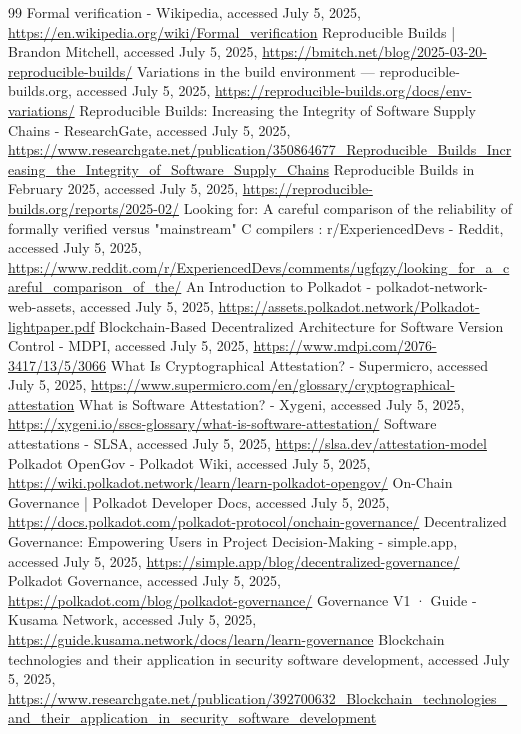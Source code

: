 \documentclass{article}
\begin{document}
\begin{thebibliography}{99}
Formal verification - Wikipedia, accessed July 5, 2025, \url{https://en.wikipedia.org/wiki/Formal\_verification}
Reproducible Builds | Brandon Mitchell, accessed July 5, 2025, \url{https://bmitch.net/blog/2025-03-20-reproducible-builds/}
Variations in the build environment --- reproducible-builds.org, accessed July 5, 2025, \url{https://reproducible-builds.org/docs/env-variations/}
Reproducible Builds: Increasing the Integrity of Software Supply Chains - ResearchGate, accessed July 5, 2025, \url{https://www.researchgate.net/publication/350864677\_Reproducible\_Builds\_Increasing\_the\_Integrity\_of\_Software\_Supply\_Chains}
Reproducible Builds in February 2025, accessed July 5, 2025, \url{https://reproducible-builds.org/reports/2025-02/}
Looking for: A careful comparison of the reliability of formally verified versus "mainstream" C compilers : r/ExperiencedDevs - Reddit, accessed July 5, 2025, \url{https://www.reddit.com/r/ExperiencedDevs/comments/ugfqzy/looking\_for\_a\_careful\_comparison\_of\_the/}
An Introduction to Polkadot - polkadot-network-web-assets, accessed July 5, 2025, \url{https://assets.polkadot.network/Polkadot-lightpaper.pdf}
Blockchain-Based Decentralized Architecture for Software Version Control - MDPI, accessed July 5, 2025, \url{https://www.mdpi.com/2076-3417/13/5/3066}
What Is Cryptographical Attestation? - Supermicro, accessed July 5, 2025, \url{https://www.supermicro.com/en/glossary/cryptographical-attestation}
What is Software Attestation? - Xygeni, accessed July 5, 2025, \url{https://xygeni.io/sscs-glossary/what-is-software-attestation/}
Software attestations - SLSA, accessed July 5, 2025, \url{https://slsa.dev/attestation-model}
Polkadot OpenGov - Polkadot Wiki, accessed July 5, 2025, \url{https://wiki.polkadot.network/learn/learn-polkadot-opengov/}
On-Chain Governance | Polkadot Developer Docs, accessed July 5, 2025, \url{https://docs.polkadot.com/polkadot-protocol/onchain-governance/}
Decentralized Governance: Empowering Users in Project Decision-Making - simple.app, accessed July 5, 2025, \url{https://simple.app/blog/decentralized-governance/}
Polkadot Governance, accessed July 5, 2025, \url{https://polkadot.com/blog/polkadot-governance/}
Governance V1 · Guide - Kusama Network, accessed July 5, 2025, \url{https://guide.kusama.network/docs/learn/learn-governance}
Blockchain technologies and their application in security software development, accessed July 5, 2025, \url{https://www.researchgate.net/publication/392700632\_Blockchain\_technologies\_and\_their\_application\_in\_security\_software\_development}

\end{thebibliography}
\end{document}

